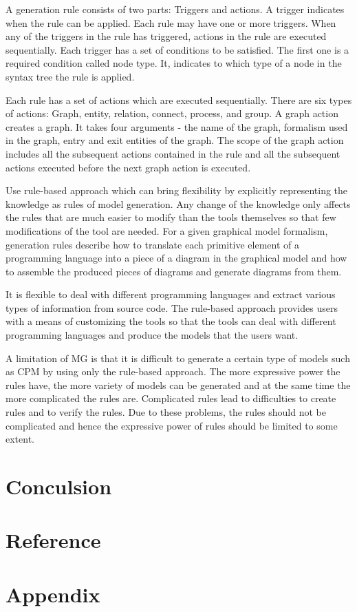 \documentclass[acmsmall]{acmart}
\begin{document}
A generation rule consists of two parts: Triggers and actions. A trigger indicates when the rule can be applied. Each rule may have one or more triggers. When any of the triggers in the rule has triggered, actions in the rule are executed sequentially. Each trigger has a set of conditions to be satisfied. The first one is a required condition called node type. It, indicates to which type of a node in the syntax tree the rule is applied.

Each rule has a set of actions which are executed sequentially. There are six types of actions: Graph, entity, relation, connect, process, and group. A graph action creates a graph. It takes four arguments - the name of the graph, formalism used in the graph, entry and exit entities of the graph. The scope of the graph action includes all the subsequent actions contained in the rule and all the subsequent actions executed before the next graph action is executed.

Use rule-based approach which can bring flexibility by explicitly representing the knowledge as rules of model generation. Any change of the knowledge only affects the rules that are much easier to modify than the tools themselves so that few modifications of the tool are needed. For a given graphical model formalism, generation rules describe how to translate each primitive element of a programming language into a piece of a diagram in the graphical model and how to assemble the produced pieces of diagrams and generate diagrams from them.

It is flexible to deal with different programming languages and extract various types of information from source code. The rule-based approach provides users with a means of customizing the tools so that the tools can deal with different programming languages and produce the models that the users want.


A limitation of MG is that it is difficult to generate a certain type of models such as CPM by using only the rule-based approach. The more expressive power the rules have, the more variety of models can be generated and at the same time the more complicated the rules are. Complicated rules lead to difficulties to create rules and to verify the rules. Due to these problems, the rules should not be complicated and hence the expressive power of rules should be limited to some extent.
\section{Conculsion}

\section{Reference}



\section{Appendix}
\end{document}
